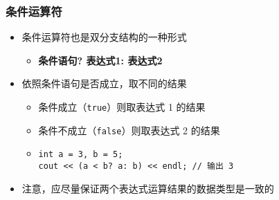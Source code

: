 \begin{frame}[fragile]
    \frametitle{条件运算符}

    \begin{itemize}[<+->]
        \item 条件运算符也是双分支结构的一种形式

            \begin{itemize}
                \item \textbf{条件语句? \enspace 表达式1: \enspace 表达式2}
            \end{itemize}

        \item 依照条件语句是否成立，取不同的结果 

            \begin{itemize}
                \item 条件成立（\lstinline|true|）则取表达式 1 的结果
                \item 条件不成立（\lstinline|false|）则取表达式 2 的结果
                \item
                    \lstinline|int a = 3, b = 5;|\\
                    \lstinline{cout << (a < b? a: b) << endl; // 输出 3}
            \end{itemize}

        \item 注意，应尽量保证两个表达式运算结果的数据类型是一致的
    \end{itemize}
\end{frame}

